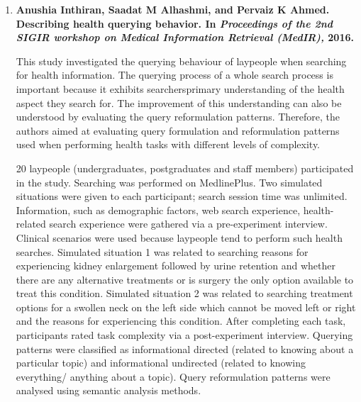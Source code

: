 \documentclass[]{article}
\begin{document}
\begin{enumerate}
Therefore, a health information retrieval system can classify query keywords as common consumer terms and medical specified terms using Consumer Health Vocabulary and Medical Subject Headings, detect query reformulation patterns, including semantic changes using Unified Medical Language System (UMLS) Semantic Network and track the site selection in order to estimate consumers\textquotesingle  familiarity with the health-related search tasks. Once familiarity is estimated, the system is able to supply query suggestions and suggest recommendations to lay people and provide personalized search results. \\	
	
\item {\textbf{Anushia Inthiran, Saadat M Alhashmi, and Pervaiz K Ahmed. Describing health querying behavior. In \textit{Proceedings of the 2nd SIGIR workshop on Medical Information Retrieval (MedIR),} 2016.}} 

This study investigated the querying behaviour of laypeople when searching for health information. The querying process of a whole search process is important because it exhibits searchers\textquotesingle  primary understanding of the health aspect they search for. The improvement of this understanding can also be understood by evaluating the query reformulation patterns. Therefore, the authors aimed at evaluating query formulation and reformulation patterns used when performing health tasks with different levels of complexity. 

20 laypeople (undergraduates, postgraduates and staff members) participated in the study. Searching was performed on MedlinePlus. Two simulated situations were given to each participant; search session time was unlimited. Information, such as demographic factors, web search experience, health-related search experience were gathered via a pre-experiment interview. Clinical scenarios were used because laypeople tend to perform such health searches. Simulated situation 1 was related to searching reasons for experiencing kidney enlargement followed by urine retention and whether there are any alternative treatments or is surgery the only option available to treat this condition. Simulated situation 2 was related to searching treatment options for a swollen neck on the left side which cannot be moved left or right and the reasons for experiencing this condition. After completing each task, participants rated task complexity via a post-experiment interview. Querying patterns were classified as informational directed (related to knowing about a particular topic) and informational undirected (related to knowing everything/ anything about a topic). Query reformulation patterns were analysed using semantic analysis methods.


\end{enumerate}
\end{document}

